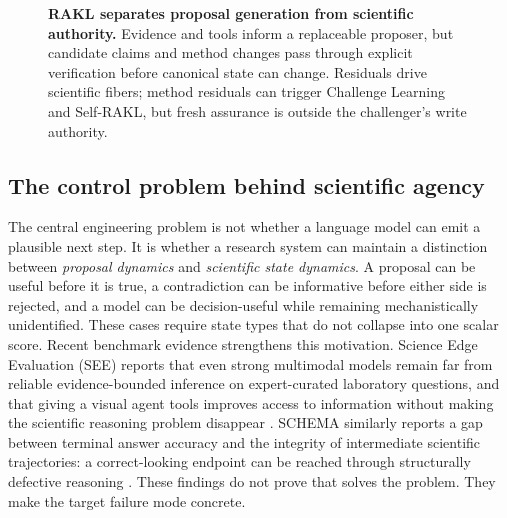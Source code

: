 \begin{figure}[t]
{}
\caption{\textbf{RAKL separates proposal generation from scientific authority.} Evidence and tools inform a replaceable proposer, but candidate claims and method changes pass through explicit verification before canonical state can change. Residuals drive scientific fibers; method residuals can trigger Challenge Learning and Self-RAKL, but fresh assurance is outside the challenger's write authority.}
\label{fig:architecture}
\end{figure}

\subsection{The control problem behind scientific agency}

The central engineering problem is not whether a language model can emit a plausible next step. It is whether a research system can maintain a distinction between \emph{proposal dynamics} and \emph{scientific state dynamics}. A proposal can be useful before it is true, a contradiction can be informative before either side is rejected, and a model can be decision-useful while remaining mechanistically unidentified. These cases require state types that do not collapse into one scalar score. Recent benchmark evidence strengthens this motivation. Science Edge Evaluation (SEE) reports that even strong multimodal models remain far from reliable evidence-bounded inference on expert-curated laboratory questions, and that giving a visual agent tools improves access to information without making the scientific reasoning problem disappear \cite{han2026see}. SCHEMA similarly reports a gap between terminal answer accuracy and the integrity of intermediate scientific trajectories: a correct-looking endpoint can be reached through structurally defective reasoning \cite{feng2026schema}. These findings do not prove that \RAKL{} solves the problem. They make the target failure mode concrete.


